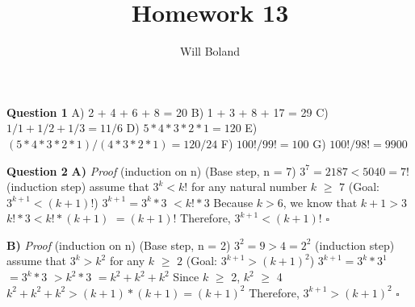 \documentclass{article}
\begin{document}
\title{Homework 13}
\author{Will Boland}
\maketitle

\textbf{Question 1}\newline
A) 2 + 4 + 6 + 8 = 20\newline
B) 1 + 3 + 8 + 17 = 29\newline
C) ${1/1 + 1/2 + 1/3 = 11/6}$\newline
D) ${5 * 4 * 3 * 2 * 1 = 120}$\newline
E) ${(5 * 4 * 3 * 2 * 1)/(4 * 3 * 2 * 1) = 120/24}$\newline
F) ${100! / 99! = 100}$\newline
G) ${100!/98! = 9900}$\newline\newline

\textbf{Question 2}\newline
\textbf{A)} \textit{Proof} (induction on n)\newline
(Base step, n = 7)\newline
${3^7 = 2187 < 5040 = 7!}$\newline\newline
(induction step)\newline
assume that ${3^k < k!}$ for any natural number ${k}$ $\geq$ ${7}$\newline
(Goal: ${3^{k+1}<(k+1)!}$)\newline
${3^{k+1} = 3^k * 3}$\newline
${ < k! * 3}$\newline
Because ${k > 6}$, we know that ${ k + 1 > 3}$\newline
${k! * 3 < k! * (k+1)}$\newline
${ = (k + 1)!}$\newline
Therefore, ${3^{k+1}<(k+1)!}$ $\square$\newline\newline


\textbf{B)} \textit{Proof} (induction on n)\newline
(Base step, n = 2)\newline
${3^2 = 9 > 4 = 2^2}$\newline\newline
(induction step)\newline
assume that ${3^k > k^2}$ for any ${k}$ $\geq$ ${2}$\newline
(Goal: ${3^{k+1}>(k+1)^2}$)\newline
${3^{k+1} = 3^k * 3^1}$\newline
${ = 3^k * 3}$\newline
${ > k^2 * 3}$\newline
${ = k^2 + k^2 + k^2}$\newline
Since ${k}$ $\geq$ 2, ${k^2}$ $\geq$ 4\newline
${k^2 + k^2 + k^2 > (k+1) * (k+1) = (k+1)^2}$\newline
Therefore,  ${3^{k+1}>(k+1)^2}$ $\square$\newline\newline
\end{document}
